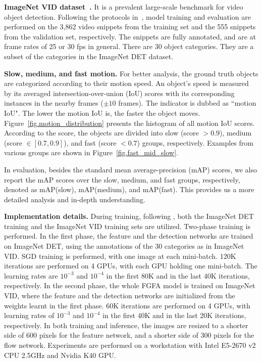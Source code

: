 \documentclass[10pt,twocolumn,letterpaper]{article}
\begin{document}
\textbf{ImageNet VID dataset~\cite{russakovsky2015imagenet}.} It is a prevalent large-scale benchmark for video object detection. Following the protocols in~\cite{kang2016tcnn,lee2016multi}, model training and evaluation are performed on the 3,862 video snippets from the training set and the 555 snippets from the validation set, respectively. The snippets are fully annotated, and are at frame rates of 25 or 30 fps in general. There are 30 object categories. They are a subset of the categories in the ImageNet DET dataset.

\textbf{Slow, medium, and fast motion.} For better analysis, the ground truth objects are categorized according to their motion speed. An object's speed is measured by its averaged intersection-over-union (IoU) scores with its corresponding instances in the nearby frames ($\pm 10$ frames). The indicator is dubbed as ``motion IoU". The lower the motion IoU is, the faster the object moves. Figure~\ref{fig.motion_distribution} presents the histogram of all motion IoU scores. According to the score, the objects are divided into slow (score $>0.9$), medium (score $\in[0.7, 0.9]$), and fast (score $<0.7$) groups, respectively. Examples from various groups are shown in Figure~\ref{fig.fast_mid_slow}.

In evaluation, besides the standard mean average-precision (mAP) scores, we also report the mAP scores over the slow, medium, and fast groups, respectively, denoted as mAP(slow), mAP(medium), and mAP(fast). This provides us a more detailed analysis and in-depth understanding.

\textbf{Implementation details.} During training, following \cite{kang2016tcnn,lee2016multi}, both the ImageNet DET training and the ImageNet VID training sets are utilized. Two-phase training is performed. In the first phase, the feature and the detection networks are trained on ImageNet DET,  using the annotations of the 30 categories as in ImageNet VID. SGD training is performed, with one image at each mini-batch. 120K iterations are performed on 4 GPUs, with each GPU holding one mini-batch. The learning rates are $10^{-3}$ and $10^{-4}$ in the first 80K and in the last 40K iterations, respectively. In the second phase, the whole FGFA model is trained on ImageNet VID, where the feature and the detection networks are initialized from the weights learnt in the first phase. 60K iterations are performed on 4 GPUs, with learning rates of  $10^{-3}$ and $10^{-4}$ in the first 40K and in the last 20K iterations, respectively. In both training and inference, the images are resized to a shorter side of 600 pixels for the feature network, and a shorter side of 300 pixels for the flow network. Experiments are performed on a workstation with Intel E5-2670 v2 CPU 2.5GHz and Nvidia K40 GPU.
\end{document}
